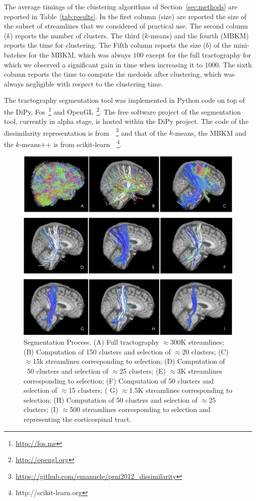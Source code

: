 The average timings of the clustering algorithms of
Section~\ref{sec:methods} are reported in Table~\ref{tab:results}. In
the first column (size) are reported the size of the subset of
streamlines that we considered of practical use. The second column
($k$) reports the number of clusters. The third ($k$-means) and the
fourth (MBKM) reports the time for clustering. The Fifth column
reports the size ($b$) of the mini-batches for the MBKM, which was
always $100$ except for the full tractography for which we observed a
significant gain in time when increasing it to $1000$. The sixth
column reports the time to compute the medoids after clustering, which
was always negligible with respect to the clustering time.

The tractography segmentation tool was implemented in Python code on
top of the DiPy, Fos~\footnote{\url{http://fos.me}} and
OpenGL~\footnote{\url{http://opengl.org}}. The free software project
of the segmentation tool, currently in alpha stage, is hosted within
the DiPy project. The code of the dissimilarity representation is
from~\cite{olivetti2012approximation}~\footnote{\url{https://github.com/emanuele/prni2012_dissimilarity}}
and that of the $k$-means, the MBKM and the $k$-means++ is from
scikit-learn~\cite{pedregosa2011scikit}~\footnote{http://scikit-learn.org}.

\begin{figure}[t]
\centering
\includegraphics[width=\textwidth]{figure}
\caption{Segmentation Process. (A) Full tractography $\approx$300K
  streamlines; (B) Computation of 150 clusters and selection of $\approx$20 clusters; (C)
  $\approx$15k streamlines corresponding to selection; (D) Computation of ~50
  clusters and selection of $\approx$25
  clusters; (E) $\approx$3K streamlines corresponding to
  selection; (F) Computation of 50 clusters and selection of $\approx$15
  clusters; ( G) $\approx$1.5K streamlines corresponding to selection; (H)
  Computation of 50 clusters and selection of $\approx$25 clusters; (I) $\approx$500
  streamlines corresponding to selection and representing the
  corticospinal tract.}
\label{fig}
\end{figure}


